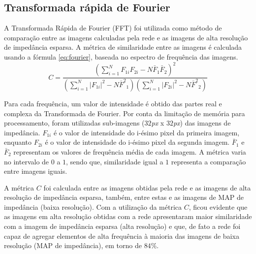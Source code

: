 \subsection{Transformada rápida de Fourier}

A Transformada Rápida de Fourier (FFT) foi utilizada como método de comparação entre as imagens calculadas pela rede
e as imagens de alta resolução de impedância esparsa. A métrica de similaridade entre as imagens é calculada usando a fórmula \ref{eq:fourier}, baseada
no espectro de frequência das imagens.
\begin{equation}
 C = \frac{ (\sum_{i=1}^{N}{F_{1i}F_{2i}} - N \bar{F}_1\bar{F}_2 )^2 }{ (\sum_{i=1}^{N}{|F_{1i}|^2} - N{\bar{F}^2}_1)( \sum_{i=1}^{N}{|F_{2i}|^2} - N{\bar{F}^2}_2 ) }
 \label{eq:fourier}
\end{equation}

Para cada frequência, um valor de intensidade é obtido das partes real e complexa da Transformada de Fourier.
Por conta da limitação de memória para processamento, foram utilizadas sub-imagens ($32$\textit{px} x $32$\textit{px}) das
imagens de impedância. $F_{1i}$ é o valor de intensidade do i-ésimo pixel da primeira imagem, enquanto $F_{2i}$
é o valor de intensidade do i-ésimo pixel da segunda imagem. $\bar{F}_1$ e $\bar{F}_2$ representam os valores
de frequência média de cada imagem. A métrica varia no intervalo de $0$ a $1$, sendo que, similaridade igual a $1$
representa a comparação entre imagens iguais.

A métrica $C$ foi calculada entre as imagens obtidas pela rede e as imagens de alta resolução de impedância esparsa, também, entre estas e
as imagens de MAP de impedância (baixa resolução). Com a utilização da métrica $C$, ficou evidente que as imagens em alta resolução obtidas com a rede apresentaram
maior similaridade com a imagem de impedância esparsa (alta resolução) e que, de fato a rede foi capaz de agregar elementos de
alta frequência à maioria das imagens de baixa resolução (MAP de impedância), em torno de $84\%$.

